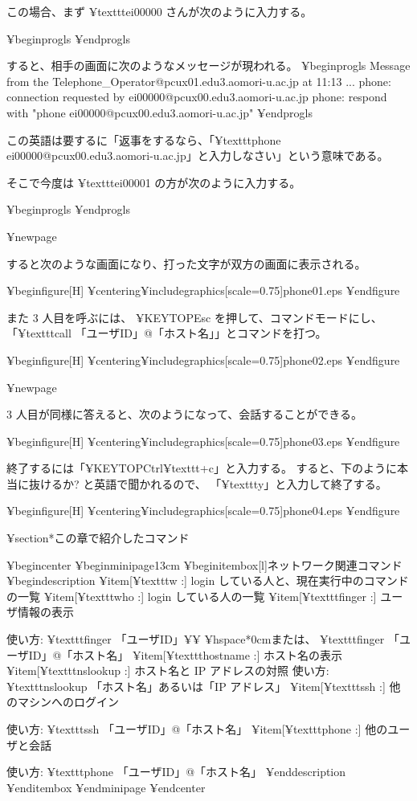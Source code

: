 この場合、まず ¥texttt{ei00000} さんが次のように入力する。

¥begin{progls}
¥end{progls}

すると、相手の画面に次のようなメッセージが現われる。
¥begin{progls}
Message from the Telephone_Operator@pcux01.edu3.aomori-u.ac.jp at 11:13 ...
phone: connection requested by ei00000@pcux00.edu3.aomori-u.ac.jp
phone: respond with "phone ei00000@pcux00.edu3.aomori-u.ac.jp"
¥end{progls}

この英語は要するに「返事をするなら、「¥texttt{phone ei00000@pcux00.edu3.aomori-u.ac.jp}」と入力しなさい」という意味である。

そこで今度は ¥texttt{ei00001} の方が次のように入力する。

¥begin{progls}
¥end{progls}

¥newpage

すると次のような画面になり、打った文字が双方の画面に表示される。

¥begin{figure}[H]
¥centering{¥includegraphics[scale=0.75]{phone01.eps}}
¥end{figure}

また 3 人目を呼ぶには、 ¥KEYTOP{Esc} を押して、コマンドモードにし、
「¥texttt{call 「ユーザID」@「ホスト名」}」とコマンドを打つ。

¥begin{figure}[H]
¥centering{¥includegraphics[scale=0.75]{phone02.eps}}
¥end{figure}

¥newpage

 3 人目が同様に答えると、次のようになって、会話することができる。

¥begin{figure}[H]
¥centering{¥includegraphics[scale=0.75]{phone03.eps}}
¥end{figure}

終了するには「¥KEYTOP{Ctrl}¥texttt{+c}」と入力する。
すると、下のように本当に抜けるか? と英語で聞かれるので、
「¥texttt{y}」と入力して終了する。

¥begin{figure}[H]
¥centering{¥includegraphics[scale=0.75]{phone04.eps}}
¥end{figure}

¥section*{この章で紹介したコマンド}

¥begin{center}
¥begin{minipage}{13cm}
¥begin{itembox}[l]{ネットワーク関連コマンド}
¥begin{description}
¥item[¥texttt{w} :] login している人と、現在実行中のコマンドの一覧
¥item[¥texttt{who} :] login している人の一覧
¥item[¥texttt{finger} :] ユーザ情報の表示

使い方: ¥texttt{finger} 「ユーザID」¥¥
¥hspace*{0cm}または、 ¥texttt{finger} 「ユーザID」@「ホスト名」
¥item[¥texttt{hostname} :] ホスト名の表示
¥item[¥texttt{nslookup} :] ホスト名と IP アドレスの対照
使い方: ¥texttt{nslookup 「ホスト名」あるいは「IP アドレス」}
¥item[¥texttt{ssh} :] 他のマシンへのログイン

使い方: ¥texttt{ssh} 「ユーザID」@「ホスト名」
¥item[¥texttt{phone} :] 他のユーザと会話

使い方: ¥texttt{phone} 「ユーザID」@「ホスト名」
¥end{description}
¥end{itembox}
¥end{minipage}
¥end{center}

